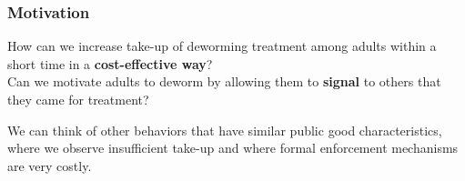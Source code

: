 \documentclass{beamer}
\theoremstyle{plain}
\renewcommand{\bf}{\textbf}
\begin{document}
\begin{frame}[label=slide3]
\frametitle{\large{Motivation}}
How can we increase take-up of deworming treatment among adults within a short time in a \bf{cost-effective way}\rm? \\
\bigskip
Can we motivate adults to deworm by allowing them to \bf{signal} \rm to others that they came for treatment? 
\bigskip
\begin{itemize}
\small{
\item We can think of other behaviors that have similar public good characteristics, where we observe insufficient take-up and where formal enforcement mechanisms are very costly.}
\end{itemize}
\end{frame}
\end{document}
